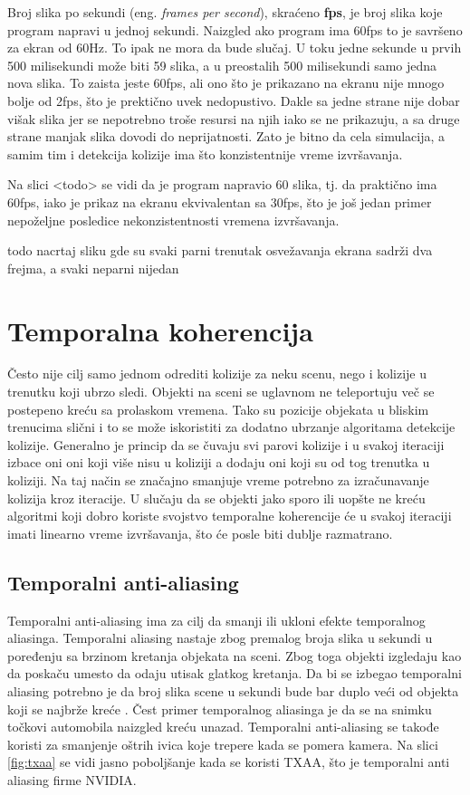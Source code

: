 \documentclass[12pt,oneside]{memoir}
\begin{document}
Broj slika po sekundi (eng. {\em frames per second}), skraćeno \textbf{fps}, je broj slika koje program napravi u jednoj sekundi.
Naizgled ako program ima 60fps to je savršeno za ekran od 60Hz. To ipak ne mora da bude slučaj.
U toku jedne sekunde u prvih 500 milisekundi može biti 59 slika, a u preostalih 500 milisekundi samo jedna nova slika. 
To zaista jeste 60fps, ali ono što je prikazano na ekranu nije mnogo bolje od 2fps, 
što je prektično uvek nedopustivo. 
Dakle sa jedne strane nije dobar višak slika jer se nepotrebno troše resursi na njih iako se ne prikazuju, 
a sa druge strane manjak slika dovodi do neprijatnosti.
Zato je bitno da cela simulacija, a samim tim i detekcija kolizije ima što konzistentnije vreme izvršavanja.

Na slici <todo> se vidi da je program napravio 60 slika, tj. da praktično ima 60fps, iako je prikaz na ekranu 
ekvivalentan sa 30fps, što je još jedan primer nepoželjne posledice nekonzistentnosti vremena izvršavanja. 

todo nacrtaj sliku gde su svaki parni trenutak osvežavanja ekrana sadrži dva frejma, a svaki neparni 
nijedan


\section{Temporalna koherencija}

Često nije cilj samo jednom odrediti kolizije za neku scenu, nego i kolizije u trenutku koji ubrzo sledi.
Objekti na sceni se uglavnom ne teleportuju več se postepeno kreću sa prolaskom vremena.
Tako su pozicije objekata u bliskim trenucima slični i to se može iskoristiti za dodatno ubrzanje algoritama 
detekcije kolizije. Generalno je princip da se čuvaju svi parovi kolizije i u svakoj iteraciji 
izbace oni oni koji više nisu u koliziji a dodaju oni koji su od tog trenutka u koliziji.
Na taj način se značajno smanjuje vreme potrebno za izračunavanje kolizija kroz iteracije.
U slučaju da se objekti jako sporo ili uopšte ne kreću algoritmi koji dobro koriste svojstvo temporalne 
koherencije će u svakoj iteraciji imati linearno vreme izvršavanja, što će posle biti dublje razmatrano. 


\subsection{Temporalni anti-aliasing}

Temporalni anti-aliasing ima za cilj da smanji ili ukloni efekte temporalnog aliasinga.
Temporalni aliasing nastaje zbog premalog broja slika u sekundi u poređenju sa brzinom kretanja objekata na sceni.
Zbog toga objekti izgledaju kao da poskaču  umesto da odaju utisak glatkog kretanja.
Da bi se izbegao temporalni aliasing potrebno je da broj slika scene u sekundi bude bar duplo veći 
od objekta koji se najbrže kreće \cite{Grant}. 
Čest primer temporalnog aliasinga je da se na snimku točkovi automobila naizgled kreću unazad.
Temporalni anti-aliasing se takođe koristi za smanjenje oštrih ivica koje trepere kada se pomera kamera.
Na slici \ref{fig:txaa} se vidi jasno poboljšanje kada se koristi TXAA, što je temporalni anti
aliasing firme NVIDIA.
\end{document}
